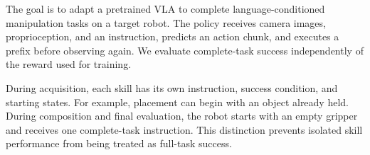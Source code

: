 The goal is to adapt a pretrained VLA to complete language-conditioned manipulation tasks on a target robot. The policy receives camera images, proprioception, and an instruction, predicts an action chunk, and executes a prefix before observing again. We evaluate complete-task success independently of the reward used for training.

During acquisition, each skill has its own instruction, success condition, and starting states. For example, placement can begin with an object already held. During composition and final evaluation, the robot starts with an empty gripper and receives one complete-task instruction. This distinction prevents isolated skill performance from being treated as full-task success.

